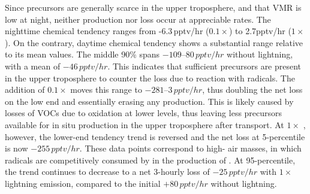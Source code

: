 Since  precursors are generally scarce in the upper troposphere, and that  VMR is low at night,
neither production nor loss occur at appreciable rates. The nighttime  chemical tendency ranges from
-6.3\,\unit{pptv/hr} ($0.1\times$) to 2.7\unit{pptv/hr} ($1\times$). On the contrary, daytime  chemical tendency
shows a substantial range relative to its mean values. The middle 90\% spans $-109$--$80\,\unit{pptv/hr}$ without lightning,
with a mean of $-46\,\unit{pptv/hr}$. This indicates that sufficient  precursors are present in the upper
troposphere to counter the loss due to reaction with  radicals. The addition of $0.1\times$ {\lnox}
moves this range to $-281$--$3\,\unit{pptv/hr}$, thus doubling the net loss on the low end and essentially erasing any
production. This is likely caused by losses of VOCs due to oxidation at lower levels, thus leaving less precursors available for in situ 
production in the upper troposphere after transport. At $1\times$ {\lnox}, however, the lower-end tendency trend is
reversed and the net loss at 5-percentile is now $-255\,\unit{pptv/hr}$. These data points correspond to high-{\lnox} air
masses, in which  radicals are competitively consumed by  in the production of .
At 95-percentile, the trend continues to decrease to a net 3-hourly loss of $-25\,\unit{pptv/hr}$ with $1\times$ lightning emission,
compared to the initial $+80\,\unit{pptv/hr}$ without lightning.


